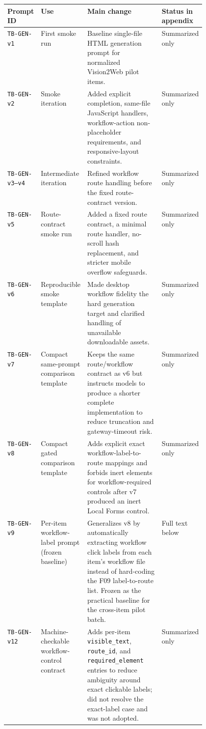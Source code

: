 \begin{table}[ht]
\centering
\footnotesize
\begin{tabularx}{\linewidth}{>{\raggedright\arraybackslash}p{0.15\linewidth}>{\raggedright\arraybackslash}p{0.16\linewidth}>{\raggedright\arraybackslash}X>{\raggedright\arraybackslash}p{0.16\linewidth}}
\toprule
\textbf{Prompt ID} & \textbf{Use} & \textbf{Main change} & \textbf{Status in appendix} \\
\midrule
\texttt{TB-GEN-v1} & First smoke run & Baseline single-file HTML generation prompt for normalized Vision2Web pilot items. & Summarized only \\
\texttt{TB-GEN-v2} & Smoke iteration & Added explicit completion, same-file JavaScript handlers, workflow-action non-placeholder requirements, and responsive-layout constraints. & Summarized only \\
\texttt{TB-GEN-v3--v4} & Intermediate iteration & Refined workflow route handling before the fixed route-contract version. & Summarized only \\
\texttt{TB-GEN-v5} & Route-contract smoke run & Added a fixed route contract, a minimal route handler, no-scroll hash replacement, and stricter mobile overflow safeguards. & Summarized only \\
\texttt{TB-GEN-v6} & Reproducible smoke template & Made desktop workflow fidelity the hard generation target and clarified handling of unavailable downloadable assets. & Summarized only \\
\texttt{TB-GEN-v7} & Compact same-prompt comparison template & Keeps the same route/workflow contract as v6 but instructs models to produce a shorter complete implementation to reduce truncation and gateway-timeout risk. & Summarized only \\
\texttt{TB-GEN-v8} & Compact gated comparison template & Adds explicit exact workflow-label-to-route mappings and forbids inert elements for workflow-required controls after v7 produced an inert Local Forms control. & Summarized only \\
\texttt{TB-GEN-v9} & Per-item workflow-label prompt (frozen baseline) & Generalizes v8 by automatically extracting workflow click labels from each item's workflow file instead of hard-coding the F09 label-to-route list. Frozen as the practical baseline for the cross-item pilot batch. & Full text below \\
\texttt{TB-GEN-v12} & Machine-checkable workflow-control contract & Adds per-item \texttt{visible\_text}, \texttt{route\_id}, and \texttt{required\_element} entries to reduce ambiguity around exact clickable labels; did not resolve the exact-label case and was not adopted. & Summarized only \\

\end{tabularx}
\end{table}
